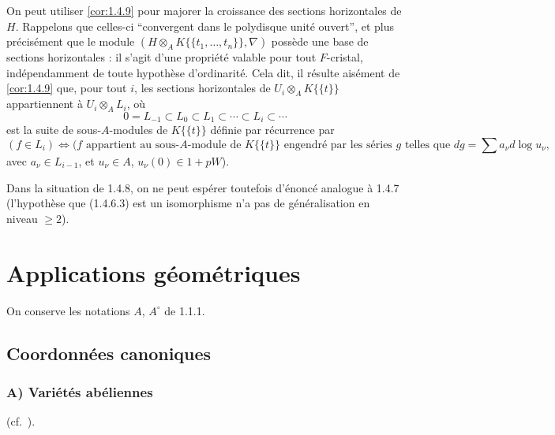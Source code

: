 \documentclass[12pt,a4paper]{article}
\theoremstyle{plain}
\theoremstyle{definition}
\theoremstyle{remark}
\begin{document}
On peut utiliser \ref{cor:1.4.9} pour majorer la croissance des sections horizontales de $H$. Rappelons \cite[3.1]{Katz1973} que celles-ci ``convergent dans le polydisque unit\'e ouvert'', et plus pr\'ecis\'ement que le module $(H \otimes_A K\{\{t_1, \ldots, t_n\}\}, \nabla)$ poss\`ede une base de sections horizontales : il s'agit d'une propri\'et\'e valable pour tout $F$-cristal, ind\'ependamment de toute hypoth\`ese d'ordinarit\'e. Cela dit, il r\'esulte ais\'ement de \ref{cor:1.4.9} que, pour tout $i$, les sections horizontales de $U_i \otimes_A K\{\{t\}\}$ appartiennent \`a $U_i \otimes_A L_i$, o\`u
\[
0 = L_{-1} \subset L_0 \subset L_1 \subset \cdots \subset L_i \subset \cdots
\]
est la suite de sous-$A$-modules de $K\{\{t\}\}$ d\'efinie par r\'ecurrence par
\[
(f \in L_i) \Longleftrightarrow (f \text{ appartient au sous-$A$-module de } K\{\{t\}\} \text{ engendr\'e par les s\'eries } g \text{ telles que } dg = \sum a_\nu d\log u_\nu,
\]
avec $a_\nu \in L_{i-1}$, et $u_\nu \in A$, $u_\nu(0) \in 1 + pW$).

Dans la situation de 1.4.8, on ne peut esp\'erer toutefois d'\'enonc\'e analogue \`a 1.4.7 (l'hypoth\`ese que (1.4.6.3) est un isomorphisme n'a pas de g\'en\'eralisation en niveau $\geqslant 2$).

\section{Applications g\'eom\'etriques}

On conserve les notations $A$, $A^\circ$ de 1.1.1.

\subsection{Coordonn\'ees canoniques}

\subsubsection{A) Vari\'et\'es ab\'eliennes} (cf.\ \cite[\S 8]{Katz1973}).

\setcounter{subsubsection}{0}
\renewcommand{\thesubsubsection}{\thesubsection.\arabic{subsubsection}}
\end{document}
